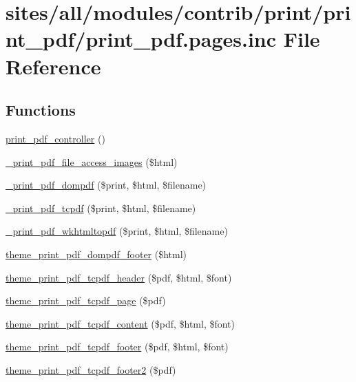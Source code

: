 \hypertarget{print__pdf_8pages_8inc}{
\section{sites/all/modules/contrib/print/print\_\-pdf/print\_\-pdf.pages.inc File Reference}
\label{print__pdf_8pages_8inc}
}
\subsection*{Functions}
\begin{CompactItemize}
\item 
\hyperlink{print__pdf_8pages_8inc_d2eb4e782095c48cf019319afa8fab06}{print\_\-pdf\_\-controller} ()
\item 
\hyperlink{print__pdf_8pages_8inc_bf0b6ad50624c030f81f2bfe43c753e6}{\_\-print\_\-pdf\_\-file\_\-access\_\-images} (\$html)
\item 
\hyperlink{print__pdf_8pages_8inc_1f00c18b79a7115894bd9495c887ea72}{\_\-print\_\-pdf\_\-dompdf} (\$print, \$html, \$filename)
\item 
\hyperlink{print__pdf_8pages_8inc_f7356382db2bd5990ed0b420128053e9}{\_\-print\_\-pdf\_\-tcpdf} (\$print, \$html, \$filename)
\item 
\hyperlink{print__pdf_8pages_8inc_b3c93d353c4f9989ff07bcb329681074}{\_\-print\_\-pdf\_\-wkhtmltopdf} (\$print, \$html, \$filename)
\item 
\hyperlink{print__pdf_8pages_8inc_fd0092da5b0cfe60cabf1b30b818c9e7}{theme\_\-print\_\-pdf\_\-dompdf\_\-footer} (\$html)
\item 
\hyperlink{print__pdf_8pages_8inc_2d29742376ed00838f80a3920bc8c37b}{theme\_\-print\_\-pdf\_\-tcpdf\_\-header} (\$pdf, \$html, \$font)
\item 
\hyperlink{print__pdf_8pages_8inc_f65ec1857a5d03a1afc62b5f6d02125d}{theme\_\-print\_\-pdf\_\-tcpdf\_\-page} (\$pdf)
\item 
\hyperlink{print__pdf_8pages_8inc_940cf9ed2d75d587a14285aec0f01f35}{theme\_\-print\_\-pdf\_\-tcpdf\_\-content} (\$pdf, \$html, \$font)
\item 
\hyperlink{print__pdf_8pages_8inc_25f419982a26a07b6a35d7756a432b4e}{theme\_\-print\_\-pdf\_\-tcpdf\_\-footer} (\$pdf, \$html, \$font)
\item 
\hyperlink{print__pdf_8pages_8inc_54ec83c33978bd1494667eef3d74fb48}{theme\_\-print\_\-pdf\_\-tcpdf\_\-footer2} (\$pdf)
\end{CompactItemize}


